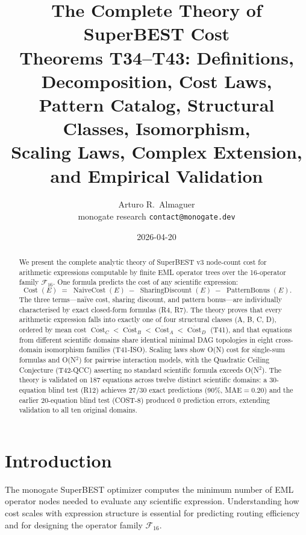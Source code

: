 \documentclass[12pt,a4paper]{article}
\title{The Complete Theory of SuperBEST Cost\\[6pt]
       \large Theorems T34--T43: Definitions, Decomposition, Cost Laws,\\
       Pattern Catalog, Structural Classes, Isomorphism,\\
       Scaling Laws, Complex Extension, and Empirical Validation}
\author{Arturo R.\ Almaguer\\
\small monogate research \quad \texttt{contact@monogate.dev}}
\date{2026-04-20}
\theoremstyle{definition}
\newcommand{\Cost}{\operatorname{Cost}}
\newcommand{\NC}{\operatorname{NaiveCost}}
\newcommand{\SD}{\operatorname{SharingDiscount}}
\newcommand{\PB}{\operatorname{PatternBonus}}
\begin{document}
\maketitle

\begin{abstract}
We present the complete analytic theory of SuperBEST v3 node-count cost for
arithmetic expressions computable by finite EML operator trees over the
16-operator family $\mathcal{F}_{16}$.
One formula predicts the cost of any scientific expression:
\[
  \Cost(E) \;=\; \NC(E) \;-\; \SD(E) \;-\; \PB(E).
\]
The three terms---na\"{i}ve cost, sharing discount, and pattern bonus---are
individually characterised by exact closed-form formulas (R4, R7).
The theory proves that every arithmetic expression falls into exactly one of
four structural classes (A, B, C, D), ordered by mean cost
$\overline{\Cost}_C < \overline{\Cost}_B < \overline{\Cost}_A <
\overline{\Cost}_D$ (T41), and that equations from different scientific domains
share identical minimal DAG topologies in eight cross-domain isomorphism
families (T41-ISO).
Scaling laws show O(N) cost for single-sum formulas and O(N$^2$) for pairwise
interaction models, with the Quadratic Ceiling Conjecture (T42-QCC) asserting
no standard scientific formula exceeds O(N$^2$).
The theory is validated on 187 equations across twelve distinct scientific
domains: a 30-equation blind test (R12) achieves 27/30 exact predictions
(90\%, MAE${}=0.20$) and the earlier 20-equation blind test (COST-8) produced
0 prediction errors, extending validation to all ten original domains.
\end{abstract}

\tableofcontents
\bigskip

\section{Introduction}
\label{sec:intro}

The monogate SuperBEST optimizer computes the minimum number of EML operator
nodes needed to evaluate any scientific expression.  Understanding how cost
scales with expression structure is essential for predicting routing efficiency
and for designing the operator family $\mathcal{F}_{16}$.
\end{document}
